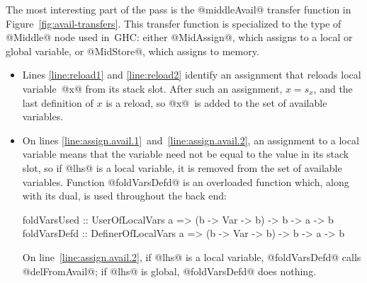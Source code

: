 \documentclass[blockstyle,preprint,natbib,nocopyrightspace]{sigplanconf}
\newcommand\lineref[1]{line~\ref{line:#1}}
\newcommand\linepairref[2]{lines \ref{line:#1}~and~\ref{line:#2}}
\newcommand\slotof[1]{\ensuremath{s_{#1}}}
\def\finalremark#1{\relax}
\newcommand\figref[1]{Figure~\ref{fig:#1}}
\begin{document}
The most interesting part of the pass is the @middleAvail@ transfer
function in \figref{avail-transfers}.\finalremark
{Let us revise the paper to pretend that global variables
don't exist.}
This transfer function is specialized to the type of @Middle@ node
used in~GHC: either @MidAssign@, which assigns to a local
or global variable, or @MidStore@, which assigns to memory.
\begin{itemize}
\item
Lines \ref{line:reload1} and \ref{line:reload2}
identify an assignment that reloads local
variable~@x@ from its stack slot.\finalremark{I propose the compiler be
modified to use @isStackSlotOf@ as I've written. JD~approves.}
After such an assignment, $x = \slotof x$,
and the last definition of $x$ is a reload,
so @x@~is added to the set of available variables.
\item
On \linepairref{assign.avail.1}{assign.avail.2},
an assignment to a local variable means that the
variable need not be equal to the value in its stack
slot, so if @lhs@ is a local variable, it is removed from the set of
available variables.
Function @foldVarsDefd@ is an overloaded function which, along with its dual,
is used throughout the back end:
\begin{code}
foldVarsUsed :: UserOfLocalVars    a 
             => (b -> Var -> b) -> b -> a -> b
foldVarsDefd :: DefinerOfLocalVars a 
             => (b -> Var -> b) -> b -> a -> b
\end{code}
On \lineref{assign.avail.2},  if @lhs@ is a local variable,
@foldVarsDefd@ calls @delFromAvail@;
 if @lhs@ is global, @foldVarsDefd@ does nothing.




\end{itemize}
\end{document}
